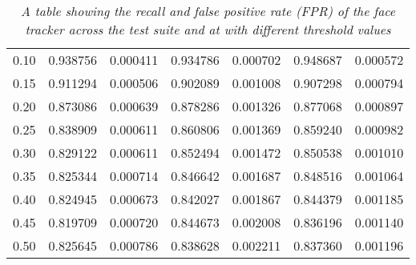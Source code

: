 \begin{table}[]
{\begin{tabular}{c|cc|cc|cc}
    0.10 &           0.938756 &        0.000411 &           0.934786 &        0.000702 &        0.948687 &     0.000572 \\
    0.15 &           0.911294 &        0.000506 &           0.902089 &        0.001008 &        0.907298 &     0.000794 \\
    0.20 &           0.873086 &        0.000639 &           0.878286 &        0.001326 &        0.877068 &     0.000897 \\
    0.25 &           0.838909 &        0.000611 &           0.860806 &        0.001369 &        0.859240 &     0.000982 \\
    0.30 &           0.829122 &        0.000611 &           0.852494 &        0.001472 &        0.850538 &     0.001010 \\
    0.35 &           0.825344 &        0.000714 &           0.846642 &        0.001687 &        0.848516 &     0.001064 \\
    0.40 &           0.824945 &        0.000673 &           0.842027 &        0.001867 &        0.844379 &     0.001185 \\
    0.45 &           0.819709 &        0.000720 &           0.844673 &        0.002008 &        0.836196 &     0.001140 \\
    0.50 &           0.825645 &        0.000786 &           0.838628 &        0.002211 &        0.837360 &     0.001196 \\

    \end{tabular}}
    \caption{\textit{A table showing the recall and false positive rate (FPR) of the face tracker across the test suite and at with different threshold values}}
\end{table}
